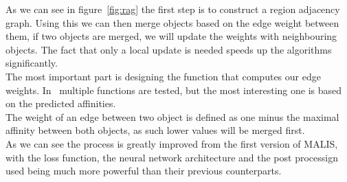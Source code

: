 As we can see in figure~\ref{fig:rag} the first step is to construct a region
adjacency graph. Using this we can then merge objects based on the edge weight
between them, if two objects are merged, we will update the weights with
neighbouring objects. The fact that only a local update is needed speeds up the
algorithms significantly.\\
The most important part is designing the function that computes our edge
weights. In~\cite{funke_large_2019} multiple functions are tested, but the most
interesting one is based on the predicted affinities.\\
The weight of an edge between  two object is defined as one minus the maximal affinity
between both objects, as such lower values will be merged first.\\


As we can see the process is greatly improved from the first version of MALIS,
with the loss function, the neural network architecture and the post processign
used being much more powerful than their previous counterparts.
